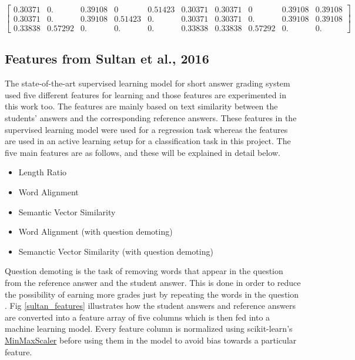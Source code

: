    {\tiny  $$ \begin{bmatrix}
    
   0.30371 & 0.  & 0.39108 & 0 &  0.51423  & 0.30371 & 0.30371 & 0 & 0.39108 & 0.39108 \\
   
   0.30371 & 0. & 0.39108 & 0.51423 & 0. &  0.30371 &  0.30371 & 0. & 0.39108 & 0.39108 \\
   
   0.33838  & 0.57292 & 0. & 0. & 0. & 0.33838 & 0.33838 & 0.57292 & 0. & 0.
   
    \end{bmatrix}  $$} 
	
	\subsection{Features from Sultan et al., 2016 \cite{Sultan2016}}
	
	The state-of-the-art supervised learning model for short answer grading system used five different features for learning and those features are experimented in this work too. The features are mainly based on text similarity between the students' answers and the corresponding reference answers. These features in the supervised learning model were used for a regression task whereas the features are used in an active learning setup for a classification task in this project. The five main features are as follows, and these will be explained in detail below. 
	
	\begin{itemize}
		\item Length Ratio
		\item Word Alignment
		\item Semantic Vector Similarity
		\item Word Alignment (with question demoting)
		\item Semanctic Vector Similarity (with question demoting)
	\end{itemize}  
	
	Question demoting is the task of removing words that appear in the question from the reference answer and the student answer. This is done in order to reduce the possibility of earning more grades just by repeating the words in the question \cite{Sultan2016}. Fig \ref{sultan_features} illustrates how the student answers and reference answers are converted into a feature array of five columns which is then fed into a machine learning model. Every feature column is normalized using scikit-learn's \href{https://scikit-learn.org/stable/modules/generated/sklearn.preprocessing.MinMaxScaler.html}{MinMaxScaler} before using them in the model to avoid bias towards a particular feature.
	
